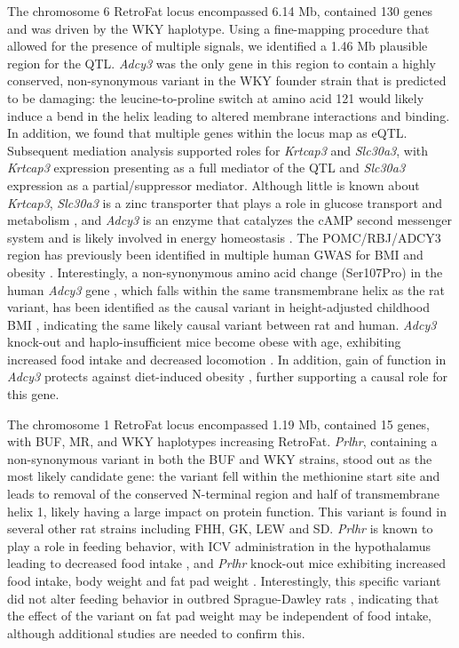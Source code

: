 The chromosome 6 RetroFat locus encompassed 6.14 Mb, contained 130 genes and was driven by the WKY haplotype. Using a fine-mapping procedure that allowed for the presence of multiple signals, we identified a 1.46 Mb plausible region for the QTL. \textit{Adcy3} was the only gene in this region to contain a highly conserved, non-synonymous variant in the WKY founder strain that is predicted to be damaging: the leucine-to-proline switch at amino acid 121 would likely induce a bend in the helix leading to altered membrane interactions and binding. In addition, we found that multiple genes within the locus map as eQTL. Subsequent mediation analysis supported roles for \textit{Krtcap3} and \textit{Slc30a3}, with \textit{Krtcap3} expression presenting as a full mediator of the QTL and \textit{Slc30a3} expression as a partial/suppressor mediator. Although little is known about \textit{Krtcap3}, \textit{Slc30a3} is a zinc transporter that plays a role in glucose transport and metabolism \citep{Smidt2009}, and \textit{Adcy3} is an enzyme that catalyzes the cAMP second messenger system and is likely involved in energy homeostasis \citep{Wu2016}.  The POMC/RBJ/ADCY3 region has previously been identified in multiple human GWAS for BMI and obesity \citep{Speliotes2010, Nordman2008, Stergiakouli2014, Wen2012}. Interestingly, a non-synonymous amino acid change (Ser107Pro) in the human \textit{Adcy3} gene \citep{Speliotes2010}, which falls within the same transmembrane helix as the rat variant, has been identified as the causal variant in height-adjusted childhood BMI \citep{Stergiakouli2014}, indicating the same likely causal variant between rat and human. \textit{Adcy3} knock-out and haplo-insufficient mice become obese with age, exhibiting increased food intake and decreased locomotion \citep{Tong2016, Wang2011a}.  In addition, gain of function in \textit{Adcy3} protects against diet-induced obesity \citep{Pitman2014}, further supporting a causal role for this gene.  

The chromosome 1 RetroFat locus encompassed 1.19 Mb, contained 15 genes, with BUF, MR, and WKY haplotypes increasing RetroFat. \textit{Prlhr}, containing a non-synonymous variant in both the BUF and WKY strains, stood out as the most likely candidate gene: the variant fell within the methionine start site and leads to removal of the conserved N-terminal region and half of transmembrane helix 1, likely having a large impact on protein function. This variant is found in several other rat strains including FHH, GK, LEW and SD. \textit{Prlhr} is known to play a role in feeding behavior, with ICV administration in the hypothalamus leading to decreased food intake \citep{Lawrence2000}, and \textit{Prlhr} knock-out mice exhibiting increased food intake, body weight and fat pad weight \citep{Gu2004a}.   Interestingly, this specific variant did not alter feeding behavior in outbred Sprague-Dawley rats \citep{Ellacott2005}, indicating that the effect of the variant on fat pad weight may be independent of food intake, although additional studies are needed to confirm this.


